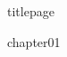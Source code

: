 \documentclass[a4paper,12pt,oneside]{book}
\begin{document}
    \frontmatter
    {titlepage}
    \tableofcontents

    \mainmatter
    {chapter01}
\end{document}
